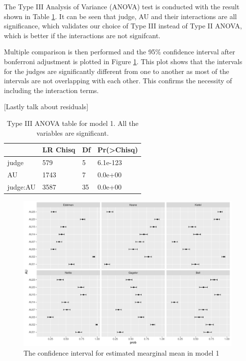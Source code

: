 \documentclass{monashthesis}
\begin{document}
The Type III Analysis of Variance (ANOVA) test is conducted with the result shown in Table \ref{tab:anova-1}. It can be seen that judge, AU and their interactions are all significance, which validates our choice of Type III instead of Type II ANOVA, which is better if the interactions are not signifcant.

Multiple comparison is then performed and the 95\% confidence interval after bonferroni adjustment is plotted in Figure \ref{fig:model1-plot}. This plot shows that the intervals for the judges are significantly different from one to another as most of the intervals are not overlapping with each other. This confirms the necessity of including the interaction terms.

{[}Lastly talk about residuals{]}

\begin{table}

\caption{\label{tab:anova-1}\label{tab:anova-1}Type III ANOVA table for model 1. All the variables are significant.}
\centering
\begin{tabular}[t]{l|l|l|l}
\hline
  & LR Chisq & Df & Pr(>Chisq)\\
\hline
judge & 579 & 5 & 6.1e-123\\
\hline
AU & 1743 & 7 & 0.0e+00\\
\hline
judge:AU & 3587 & 35 & 0.0e+00\\
\hline
\end{tabular}
\end{table}

\begin{figure}

{\centering \includegraphics[width=1\linewidth]{figures/model1-plot-1} 

}

\caption{The confidence interval for estimated mearginal mean in model 1}\label{fig:model1-plot}
\end{figure}
\end{document}
